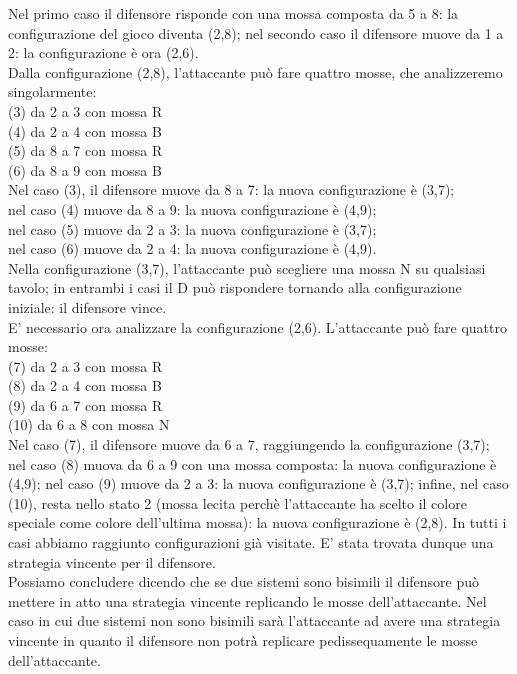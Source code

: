 \documentclass[a4paper,11pt,twoside,openright]{report}
\begin{document}
Nel primo caso il difensore risponde con una mossa composta da 5 a 8: la configurazione del gioco diventa (2,8); nel secondo caso il difensore muove da 1 a 2: la configurazione è ora (2,6).\\
Dalla configurazione (2,8), l'attaccante può fare quattro mosse, che analizzeremo singolarmente:\\
(3) da 2 a 3 con mossa R\\
(4) da 2 a 4 con mossa B\\
(5) da 8 a 7 con mossa R\\
(6) da 8 a 9 con mossa B\\

Nel caso (3), il difensore muove da 8 a 7: la nuova configurazione è (3,7);\\
nel caso (4) muove da 8 a 9: la nuova configurazione è (4,9);\\
nel caso (5) muove da 2 a 3: la nuova configurazione è (3,7);\\
nel caso (6) muove da 2 a 4: la nuova configurazione è (4,9).\\

Nella configurazione (3,7), l'attaccante può scegliere una mossa N su qualsiasi tavolo; in entrambi i casi il D può rispondere tornando alla configurazione iniziale: il difensore vince.\\
E' necessario ora analizzare la configurazione (2,6). L'attaccante può fare quattro mosse:\\
(7) da 2 a 3 con mossa R\\
(8) da 2 a 4 con mossa B\\
(9) da 6 a 7 con mossa R\\
(10) da 6 a 8 con mossa N\\

Nel caso (7), il difensore muove da 6 a 7, raggiungendo la configurazione (3,7); nel caso (8) muova da 6 a 9 con una mossa composta: la nuova configurazione è (4,9); nel caso (9) muove da 2 a 3: la nuova configurazione è (3,7); infine, nel caso (10), resta nello stato 2 (mossa lecita perchè l'attaccante ha scelto il colore speciale come colore dell'ultima mossa): la nuova configurazione è (2,8). In tutti i casi abbiamo raggiunto configurazioni già visitate. E' stata  trovata dunque una strategia vincente per il difensore.\\
Possiamo concludere dicendo che se due sistemi sono bisimili il difensore può mettere in atto una strategia vincente replicando le mosse dell'attaccante. Nel caso in cui due sistemi non sono bisimili sarà l'attaccante ad avere una strategia vincente in quanto il difensore non potrà replicare pedissequamente le mosse dell'attaccante.
\end{document}
